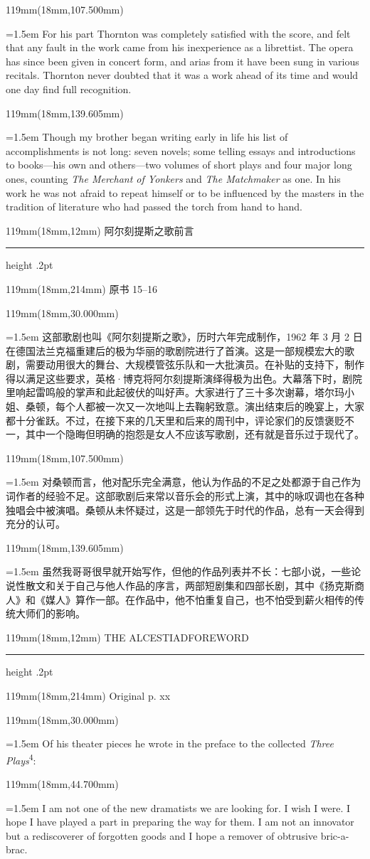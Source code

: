 \documentclass{article}
\newcommand{\ENsetup}{\normalfont\color{ink}\fontsize{11}{16.5}\selectfont\emergencystretch=1.5em}
\newcommand{\ZHsetup}{\normalfont\color{ink}\fontsize{10.5}{17}\selectfont\emergencystretch=1.5em}
\newcommand{\Block}[3]{\begin{textblock*}{119mm}(18mm,#1mm){#2 #3\par}\end{textblock*}}
\newcommand{\Heading}[3]{%
  \begin{textblock*}{119mm}(18mm,12mm)
    \color{quiet}\fontsize{7.5}{10}\selectfont
    #1\hfill #2\par\vspace{3mm}\hrule height .2pt
  \end{textblock*}
  \begin{textblock*}{119mm}(18mm,214mm)
    \color{quiet}\fontsize{7}{10}\selectfont #3\hfill\thepage
  \end{textblock*}
}
\begin{document}
\Block{107.500}{\ENsetup}{For his part Thornton was completely satisfied with the score, and felt that any fault in the work came from his inexperience as a librettist. The opera has since been given in concert form, and arias from it have been sung in various recitals. Thornton never doubted that it was a work ahead of its time and would one day find full recognition.\par}
\Block{139.605}{\ENsetup}{Though my brother began writing early in life his list of accomplishments is not long: seven novels; some telling essays and introductions to books—his own and others—two volumes of short plays and four major long ones, counting \textit{The Merchant of Yonkers} and \textit{The Matchmaker} as one. In his work he was not afraid to repeat himself or to be influenced by the masters in the tradition of literature who had passed the torch from hand to hand.\par}
\newpage
\null
\Heading{阿尔刻提斯之歌}{前言}{原书 15–16}
\Block{30.000}{\ZHsetup}{这部歌剧也叫《阿尔刻提斯之歌》，历时六年完成制作，1962 年 3 月 2 日在德国法兰克福重建后的极为华丽的歌剧院进行了首演。这是一部规模宏大的歌剧，需要动用很大的舞台、大规模管弦乐队和一大批演员。在补贴的支持下，制作得以满足这些要求，英格·博克将阿尔刻提斯演绎得极为出色。大幕落下时，剧院里响起雷鸣般的掌声和此起彼伏的叫好声。大家进行了三十多次谢幕，塔尔玛小姐、桑顿，每个人都被一次又一次地叫上去鞠躬致意。演出结束后的晚宴上，大家都十分雀跃。不过，在接下来的几天里和后来的周刊中，评论家们的反馈褒贬不一，其中一个隐晦但明确的抱怨是女人不应该写歌剧，还有就是音乐过于现代了。\par }
\Block{107.500}{\ZHsetup}{对桑顿而言，他对配乐完全满意，他认为作品的不足之处都源于自己作为词作者的经验不足。这部歌剧后来常以音乐会的形式上演，其中的咏叹调也在各种独唱会中被演唱。桑顿从未怀疑过，这是一部领先于时代的作品，总有一天会得到充分的认可。\par }
\Block{139.605}{\ZHsetup}{虽然我哥哥很早就开始写作，但他的作品列表并不长：七部小说，一些论说性散文和关于自己与他人作品的序言，两部短剧集和四部长剧，其中《扬克斯商人》和《媒人》算作一部。在作品中，他不怕重复自己，也不怕受到薪火相传的传统大师们的影响。\par }
\newpage
\null
\Heading{THE ALCESTIAD}{FOREWORD}{Original p. xx}
\Block{30.000}{\ENsetup}{Of his theater pieces he wrote in the preface to the collected \textit{Three Plays}\textsuperscript{4}:\par}
\Block{44.700}{\ENsetup}{\leftskip=4mm\rightskip=3mm 
I am not one of the new dramatists we are looking for. I wish I were. I hope I have played a part in preparing the way for them. I am not an innovator but a rediscoverer of forgotten goods and I hope a remover of obtrusive bric-a-brac.\par}
\end{document}

